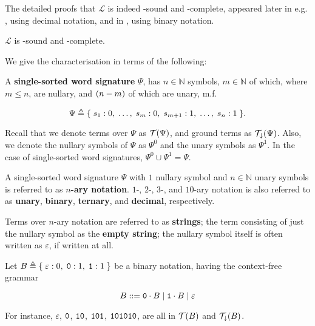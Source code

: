 The detailed proofs that $\mathcal{L}$ is indeed \FPTIME-sound and
\FPTIME-complete, appeared later in e.g.  \cite{rose-1984}, using decimal
notation, and in \cite{tourlakis-1984, clote-1999}, using binary notation.

\begin{lemma} $\mathcal{L}$ is \FPTIME{}-sound and \FPTIME{}-complete.
\end{lemma}

We give the characterisation in terms of the following:

\begin{definition} A \textbf{single-sorted word signature} $\Psi$,
has $n \in \mathbb{N}$ symbols, $m \in \mathbb{N}$ of which, where $m \leq n$,
are nullary, and ${\mathopen{}\left({n-m}\right)\mathclose{}}$ of which are unary, m.f.

$$\Psi \triangleq \mathopen{}\left\{\mathrel{}{s_1 : 0, \; \ldots, \; s_m : 0, \; s_{m+1} : 1, \;
\ldots, \; s_n : 1}\mathrel{}\right\}\mathclose{}.$$

\end{definition}

Recall that we denote terms over $\Psi$ as $\mathcal{T}{\mathopen{}\left({\Psi}\right)\mathclose{}}$, and ground
terms as $\mathcal{T}_\downarrow{\ensuremath{\mathopen{}\left({\Psi}\right)\mathclose{}}}$. Also, we denote the nullary symbols
of $\Psi$ as $\Psi^0$ and the unary symbols as $\Psi^1$. In the case of
single-sorted word signatures, $\Psi^0 \cup \Psi^1 = \Psi$.

\begin{definition} A single-sorted word signature $\Psi$ with $1$ nullary
symbol and $n \in \mathbb{N}$ unary symbols is referred to as \textbf{$n$-ary
notation}. $1$-, $2$-, $3$-, and $10$-ary notation is also referred to as
\textbf{unary}, \textbf{binary}, \textbf{ternary}, and \textbf{decimal},
respectively.  \end{definition}

\begin{definition} Terms over $n$-ary notation are referred to as
\textbf{strings}; the term consisting of just the nullary symbol as the
\textbf{empty string}; the nullary symbol itself is often written as
$\varepsilon$, if written at all. \end{definition} 

\begin{example} Let $B \triangleq \mathopen{}\left\{\mathrel{}{\varepsilon : 0, \; \mathtt{0} : 1, \;
\mathtt{1} : 1}\mathrel{}\right\}\mathclose{}$ be a binary notation, having the context-free grammar

$$B ::= \mathtt{0} \cdot B \mid \mathtt{1} \cdot B \mid \varepsilon$$

For instance, $\varepsilon$, $\mathtt{0}$, $\mathtt{1}\mathtt{0}$,
$\mathtt{1}\mathtt{0}\mathtt{1}$, $\mathtt{1}\mathtt{0}\mathtt{1}\mathtt{0}\mathtt{1}\mathtt{0}$,
are all in $\mathcal{T}{\mathopen{}\left({B}\right)\mathclose{}}$ and $\mathcal{T}_\downarrow{\ensuremath{\mathopen{}\left({B}\right)\mathclose{}}}$.

\end{example}

